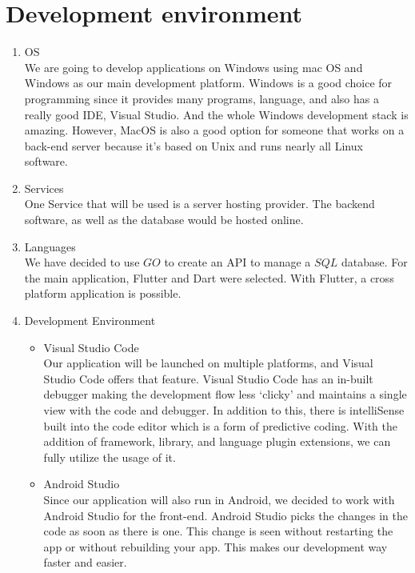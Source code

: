 \documentclass[10pt]{article}
\begin{document}
\section{Development environment}
\begin{enumerate}
  \item {OS} \\
  We are going to develop applications on Windows using mac OS and Windows as our main development platform. Windows is a good choice for programming since it provides many programs, language, and also has a really good IDE, Visual Studio. And the whole Windows development stack is amazing. However, MacOS is also a good option for someone that works on a back-end server because it's based on Unix and runs nearly all Linux software.
  
  \item {Services} \\
  One Service that will be used is a server hosting provider. The backend software, as well as the database would be hosted online.
  
  \item {Languages} \\
  We have decided to use $G O$ to create an API to manage a $S Q L$ database. For the main application, Flutter and Dart were selected. With Flutter, a cross platform application is possible.
  
  \item {Development Environment} \\
   
  \begin{itemize}
    \item {Visual Studio Code} \\
    
    Our application will be launched on multiple platforms, and Visual Studio Code offers that feature. Visual Studio Code has an in-built debugger making the development flow less ‘clicky’ and maintains a single view with the code and debugger. In addition to this, there is intelliSense built into the code editor which is a form of predictive coding. With the addition of framework, library, and language plugin extensions, we can fully utilize the usage of it.

    \item {Android Studio} \\
    
    Since our application will also run in Android, we decided to work with Android Studio for the front-end. Android Studio picks the changes in the code as soon as there is one. This change is seen without restarting the app or without rebuilding your app. This makes our development way faster and easier.


\end{itemize}
\end{enumerate}
\end{document}

